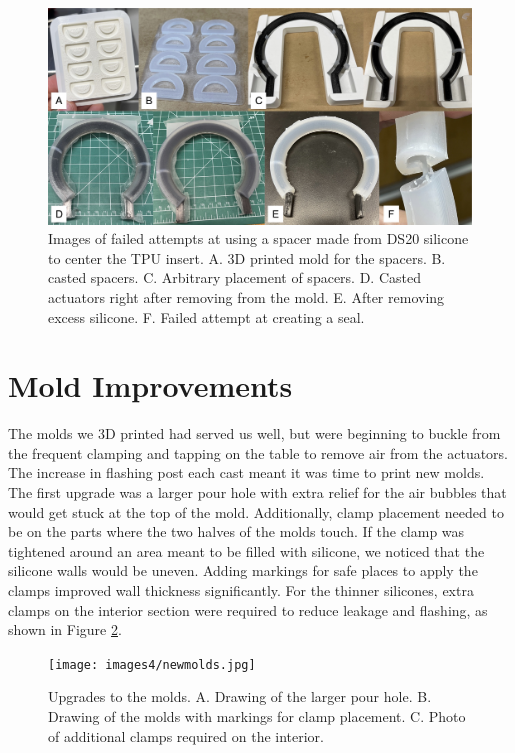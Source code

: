 \begin{figure}[h]
    \centering
    \includegraphics[width=6 in]{images4/ds20spacer.jpg}
    \caption{Images of failed attempts at using a spacer made from DS20 silicone to center the TPU insert. A. 3D printed mold for the spacers. B. casted spacers. C. Arbitrary placement of spacers. D. Casted actuators right after removing from the mold. E. After removing excess silicone. F. Failed attempt at creating a seal.}
    \label{fig:ds20spacer}
\end{figure}

\section{Mold Improvements}
The molds we 3D printed had served us well, but were beginning to buckle from the frequent clamping and tapping on the table to remove air from the actuators. The increase in flashing post each cast meant it was time to print new molds. The first upgrade was a larger pour hole with extra relief for the air bubbles that would get stuck at the top of the mold. Additionally, clamp placement needed to be on the parts where the two halves of the molds touch. If the clamp was tightened around an area meant to be filled with silicone, we noticed that the silicone walls would be uneven. Adding markings for safe places to apply the clamps improved wall thickness significantly. For the thinner silicones, extra clamps on the interior section were required to reduce leakage and flashing, as shown in Figure \ref{fig:newmolds}.

\begin{figure}[h]
    \centering
    \texttt{[image: images4/newmolds.jpg]}
    \caption{Upgrades to the molds. A. Drawing of the larger pour hole. B. Drawing of the molds with markings for clamp placement. C. Photo of additional clamps required on the interior.}
    \label{fig:newmolds}
\end{figure}

